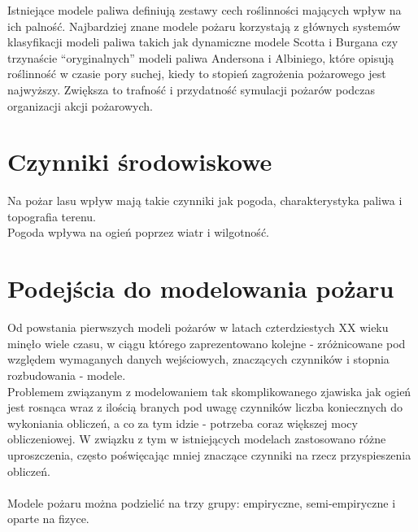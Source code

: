 \documentclass[a4paper, 11pt]{article}
\begin{document}
 Istniejące modele paliwa definiują zestawy cech roślinności mających wpływ na ich palność. Najbardziej znane modele pożaru korzystają z głównych systemów klasyfikacji modeli paliwa takich jak dynamiczne modele Scotta i Burgana czy trzynaście ``oryginalnych'' modeli paliwa Andersona i Albiniego, które opisują roślinność w czasie pory suchej, kiedy to stopień zagrożenia pożarowego jest najwyższy. Zwiększa to trafność i przydatność symulacji pożarów podczas organizacji akcji pożarowych.
	 
	
	
	
	
	
	
	
	
	\section*{Czynniki środowiskowe}
		Na pożar lasu wpływ mają takie czynniki jak pogoda, charakterystyka paliwa i topografia terenu.\\
		Pogoda wpływa na ogień poprzez wiatr i wilgotność.
	\section*{Podejścia do modelowania pożaru}
	\indent
	
	Od powstania pierwszych modeli pożarów w latach czterdziestych XX wieku minęło wiele czasu, w ciągu którego zaprezentowano kolejne - zróżnicowane pod względem wymaganych danych wejściowych, znaczących czynników i stopnia rozbudowania - modele.\\
	\indent	Problemem związanym z modelowaniem tak skomplikowanego zjawiska jak ogień jest rosnąca wraz z ilością branych pod uwagę czynników liczba koniecznych do wykoniania obliczeń, a co za tym idzie - potrzeba coraz większej mocy obliczeniowej. W związku z tym w istniejących modelach zastosowano różne uproszczenia, często poświęcając mniej znaczące czynniki na rzecz przyspieszenia obliczeń.  \\
	\\
	Modele pożaru można podzielić na trzy grupy: empiryczne, semi-empiryczne i oparte na fizyce.
\end{document}

